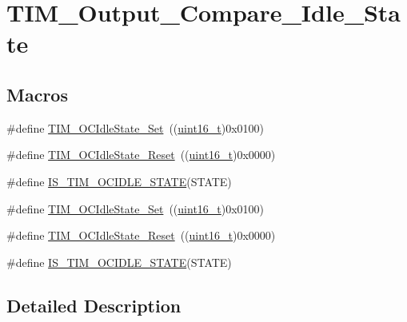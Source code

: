 \hypertarget{group___t_i_m___output___compare___idle___state}{}\section{T\+I\+M\+\_\+\+Output\+\_\+\+Compare\+\_\+\+Idle\+\_\+\+State}
\label{group___t_i_m___output___compare___idle___state}
\subsection*{Macros}
\begin{DoxyCompactItemize}
\item 
\#define \hyperlink{group___t_i_m___output___compare___idle___state_ga86d8f895a1ec584323f6c02c7edfad4c}{T\+I\+M\+\_\+\+O\+C\+Idle\+State\+\_\+\+Set}~((\hyperlink{_p_e___types_8h_a1f1825b69244eb3ad2c7165ddc99c956}{uint16\+\_\+t})0x0100)
\item 
\#define \hyperlink{group___t_i_m___output___compare___idle___state_gace5465bc9e90ba7862b3af9e6cc9b97e}{T\+I\+M\+\_\+\+O\+C\+Idle\+State\+\_\+\+Reset}~((\hyperlink{_p_e___types_8h_a1f1825b69244eb3ad2c7165ddc99c956}{uint16\+\_\+t})0x0000)
\item 
\#define \hyperlink{group___t_i_m___output___compare___idle___state_ga69c62dcc15f9d39108b19b64205d689e}{I\+S\+\_\+\+T\+I\+M\+\_\+\+O\+C\+I\+D\+L\+E\+\_\+\+S\+T\+A\+TE}(S\+T\+A\+TE)
\item 
\#define \hyperlink{group___t_i_m___output___compare___idle___state_ga86d8f895a1ec584323f6c02c7edfad4c}{T\+I\+M\+\_\+\+O\+C\+Idle\+State\+\_\+\+Set}~((\hyperlink{_p_e___types_8h_a1f1825b69244eb3ad2c7165ddc99c956}{uint16\+\_\+t})0x0100)
\item 
\#define \hyperlink{group___t_i_m___output___compare___idle___state_gace5465bc9e90ba7862b3af9e6cc9b97e}{T\+I\+M\+\_\+\+O\+C\+Idle\+State\+\_\+\+Reset}~((\hyperlink{_p_e___types_8h_a1f1825b69244eb3ad2c7165ddc99c956}{uint16\+\_\+t})0x0000)
\item 
\#define \hyperlink{group___t_i_m___output___compare___idle___state_ga69c62dcc15f9d39108b19b64205d689e}{I\+S\+\_\+\+T\+I\+M\+\_\+\+O\+C\+I\+D\+L\+E\+\_\+\+S\+T\+A\+TE}(S\+T\+A\+TE)
\end{DoxyCompactItemize}


\subsection{Detailed Description}


